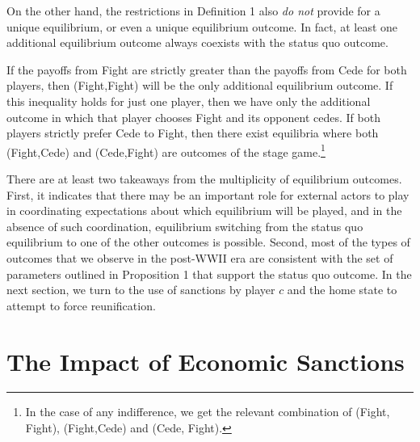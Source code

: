 \documentclass[11pt,letterpaper, notitlepage]{article}
\begin{document}
On the other hand, the restrictions in Definition 1 also \emph{do not} provide for a unique equilibrium, or even a unique equilibrium outcome. In fact, at least one additional equilibrium outcome always coexists with the status quo outcome.

If the payoffs from Fight are strictly greater than the payoffs from Cede for both players, then (Fight,Fight) will be the only additional equilibrium outcome. If this inequality holds for just one player, then we have only the additional outcome in which that player chooses Fight and its opponent cedes. If both players strictly prefer Cede to Fight, then there exist equilibria where both (Fight,Cede) and (Cede,Fight) are outcomes of the stage game.\footnote{In the case of any indifference, we get the relevant combination of (Fight, Fight), (Fight,Cede) and (Cede, Fight).}

There are at least two takeaways from the multiplicity of equilibrium outcomes. First, it indicates that there may be an important role for external actors to play in coordinating expectations about which equilibrium will be played, and in the absence of such coordination, equilibrium switching from the status quo equilibrium to one of the other outcomes is possible. Second, most of the types of outcomes that we observe in the post-WWII era are consistent with the set of parameters outlined in Proposition 1 that support the status quo outcome. In the next section, we turn to the use of sanctions by player $c$ and the home state to attempt to force reunification.

\section{The Impact of Economic Sanctions}
\label{sec:sanctions}

\end{document}
